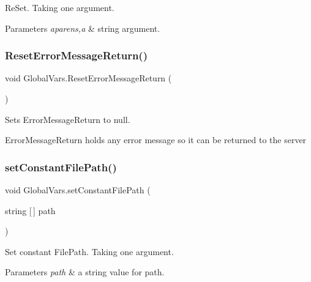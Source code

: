 Re\+Set. Taking one argument. 


\begin{DoxyParams}{Parameters}
{\em aparens,a} & string argument. \\
\hline
\end{DoxyParams}
\mbox{\label{class_global_vars_a5388dae8764cf038368193b867e881b2}} 
\subsubsection{\texorpdfstring{ResetErrorMessageReturn()}{ResetErrorMessageReturn()}}
{\footnotesize\ttfamily void Global\+Vars.\+Reset\+Error\+Message\+Return (\begin{DoxyParamCaption}{ }\end{DoxyParamCaption})\hspace{0.3cm}{\ttfamily [inline]}}



Sets Error\+Message\+Return to null. 

Error\+Message\+Return holds any error message so it can be returned to the server \mbox{\label{class_global_vars_a5fc99c8171c0e838561fe0e85778588a}} 
\subsubsection{\texorpdfstring{setConstantFilePath()}{setConstantFilePath()}}
{\footnotesize\ttfamily void Global\+Vars.\+set\+Constant\+File\+Path (\begin{DoxyParamCaption}\item[{string \mbox{[}$\,$\mbox{]}}]{path }\end{DoxyParamCaption})\hspace{0.3cm}{\ttfamily [inline]}}



Set constant File\+Path. Taking one argument. 


\begin{DoxyParams}{Parameters}
{\em path} & a string value for path. \\
\hline
\end{DoxyParams}
\mbox{\label{class_global_vars_a229e718d65ea9774c2991d516dcb67b0}} 

